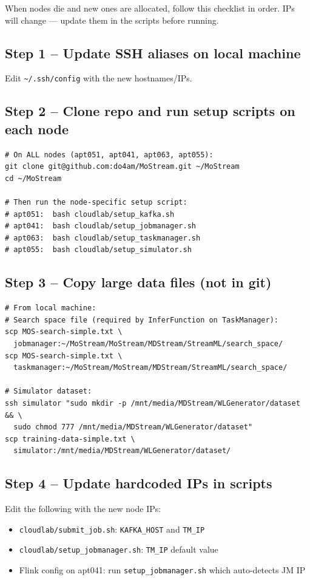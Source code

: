 \documentclass[11pt,a4paper]{article}
\begin{document}
When nodes die and new ones are allocated, follow this checklist in order.
IPs will change --- update them in the scripts before running.

\subsection{Step 1 -- Update SSH aliases on local machine}
Edit \texttt{\textasciitilde/.ssh/config} with the new hostnames/IPs.

\subsection{Step 2 -- Clone repo and run setup scripts on each node}
\begin{lstlisting}
# On ALL nodes (apt051, apt041, apt063, apt055):
git clone git@github.com:do4am/MoStream.git ~/MoStream
cd ~/MoStream

# Then run the node-specific setup script:
# apt051:  bash cloudlab/setup_kafka.sh
# apt041:  bash cloudlab/setup_jobmanager.sh
# apt063:  bash cloudlab/setup_taskmanager.sh
# apt055:  bash cloudlab/setup_simulator.sh
\end{lstlisting}

\subsection{Step 3 -- Copy large data files (not in git)}
\begin{lstlisting}
# From local machine:
# Search space file (required by InferFunction on TaskManager):
scp MOS-search-simple.txt \
  jobmanager:~/MoStream/MoStream/MDStream/StreamML/search_space/
scp MOS-search-simple.txt \
  taskmanager:~/MoStream/MoStream/MDStream/StreamML/search_space/

# Simulator dataset:
ssh simulator "sudo mkdir -p /mnt/media/MDStream/WLGenerator/dataset && \
  sudo chmod 777 /mnt/media/MDStream/WLGenerator/dataset"
scp training-data-simple.txt \
  simulator:/mnt/media/MDStream/WLGenerator/dataset/
\end{lstlisting}

\subsection{Step 4 -- Update hardcoded IPs in scripts}
Edit the following with the new node IPs:
\begin{itemize}
  \item \texttt{cloudlab/submit\_job.sh}: \texttt{KAFKA\_HOST} and \texttt{TM\_IP}
  \item \texttt{cloudlab/setup\_jobmanager.sh}: \texttt{TM\_IP} default value
  \item Flink config on apt041: run \texttt{setup\_jobmanager.sh} which auto-detects JM IP
\end{itemize}
\end{document}
